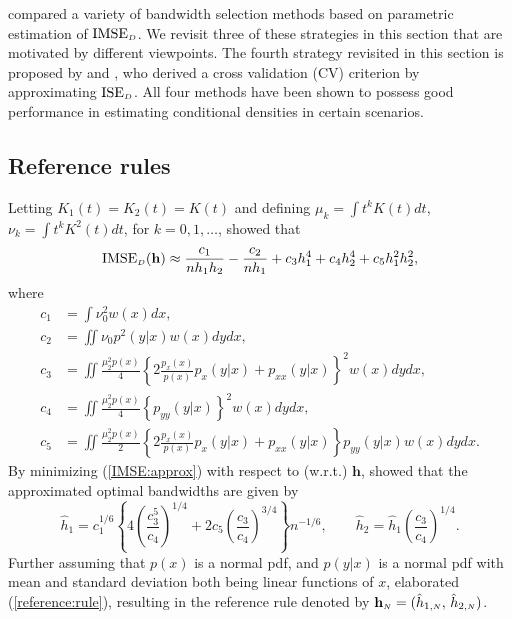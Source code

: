 \documentclass[fleqn,12pt,twoside]{article}
\newcommand{\ISE}{\mathrm{ISE}}
\newcommand{\IMSE}{\mathrm{IMSE}}
\newcommand{\bh}{\mathbf{h}}
\numberwithin{equation}{section}
\begin{document}
\cite{Bashtannyk.Hyndman2001} compared a variety of bandwidth selection methods based on parametric estimation of $\IMSE_{\hbox {\tiny $D$}}$. We revisit three of these strategies in this section that are motivated by different viewpoints. The fourth strategy revisited in this section is proposed by \cite{Fan.Yim2004} and \cite{Hall.etal2004}, who derived a cross validation (CV) criterion by approximating $\ISE_{\hbox {\tiny $D$}}$. All four methods have been shown to possess good performance in estimating conditional densities in certain scenarios. 

\subsection{Reference rules}
Letting $K_1(t)=K_2(t)=K(t)$ and defining $\mu_k=\int t^k K(t)dt$, $\nu_k=\int t^k K^2(t) dt$, for $k=0,1,\ldots$, \cite{Hyndman.etal1996} showed that 
\begin{equation}\label{IMSE:approx}
\IMSE_{\hbox {\tiny $D$}}(\bh) \approx \frac{c_1}{nh_1h_2} - \frac{c_2}{nh_1} + c_3h_1^4 + c_4h_2^4 + c_5h_1^2h_2^2,
\end{equation}
where 
\begin{align*}
c_1 &= \int \nu_0^2 w(x) dx,\\
c_2 &= \iint \nu_0 p^2(y|x) w(x) dydx,\\
c_3 &= \iint \frac{\mu_2^2p(x)}{4}\left\{ 2\frac{p_x(x)}{p(x)}p_x(y|x) + p_{xx}(y|x) \right\}^2 w(x) dydx,\\
c_4 &= \iint \frac{\mu_2^2p(x)}{4}\left\{ p_{yy}(y|x) \right\}^2 w(x) dydx,\\
c_5 &= \iint \frac{\mu_2^2p(x)}{2}\left\{ 2\frac{p_x(x)}{p(x)}p_x(y|x) + p_{xx}(y|x) \right\} p_{yy}(y|x) w(x) dydx.
\end{align*}
By minimizing (\ref{IMSE:approx}) with respect to (w.r.t.) $\bh$, \cite{Hyndman.etal1996} showed that the approximated optimal bandwidths are given by
\begin{equation}\label{reference:rule}
\hat{h}_1 = c_1^{1/6}\left\{ 4\left(\frac{c_3^5}{c_4}\right)^{1/4} + 2c_5\left(\frac{c_3}{c_4}\right)^{3/4} \right\} n^{-1/6}, \qquad
\hat{h}_2 = \hat{h}_1 \left(\frac{c_3}{c_4}\right)^{1/4}.
\end{equation}
Further assuming that $p(x)$ is a normal pdf, and $p(y|x)$ is a normal pdf with mean and standard deviation both being linear functions of $x$, \cite{Bashtannyk.Hyndman2001} elaborated (\ref{reference:rule}), resulting in the reference rule denoted by $\bh_{\hbox {\tiny $N$}}=(\hat{h}_{1, {\hbox {\tiny $N$}}}, \, \hat{h}_{2, \hbox {\tiny $N$}})$.
\end{document}
